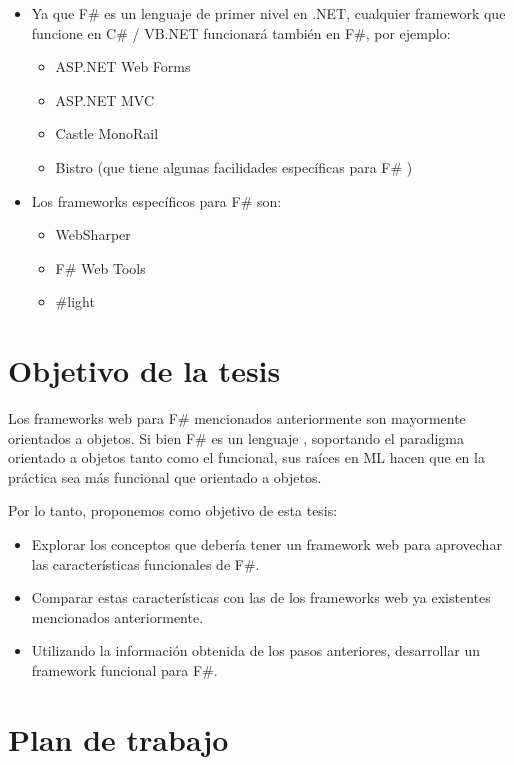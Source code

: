 \documentclass[12pt]{article}
\begin{document}
\begin{itemize}
	\item Ya que F\# es un lenguaje de primer nivel en .NET, cualquier framework que funcione en C\# / VB.NET funcionará también en F\#, por ejemplo:
	\begin{itemize}
		\item ASP.NET Web Forms \cite{webforms}
		\item ASP.NET MVC \cite{mvc}
		\item Castle MonoRail \cite{monorail}
		\item Bistro \cite{bistro} (que tiene algunas facilidades específicas para F\# \cite{bistroext})
	\end{itemize}
	\item Los frameworks específicos para F\# son:
	\begin{itemize}
		\item WebSharper \cite{websharper}
		\item F\# Web Tools \cite{fswebtools}
		\item \#light \cite{sharplight}
	\end{itemize}
\end{itemize}

\section{Objetivo de la tesis}

Los frameworks web para F\# mencionados anteriormente son mayormente orientados a objetos. Si bien F\# es un lenguaje , soportando el paradigma orientado a objetos tanto como el funcional, sus raíces en ML hacen que en la práctica sea más funcional que orientado a objetos.

Por lo tanto, proponemos como objetivo de esta tesis:
\begin{itemize}
	\item Explorar los conceptos que debería tener un framework web para aprovechar las características funcionales de F\#.
	\item Comparar estas características con las de los frameworks web ya existentes mencionados anteriormente.
	\item Utilizando la información obtenida de los pasos anteriores, desarrollar un framework funcional para F\#. 
\end{itemize}

\section{Plan de trabajo}

\printglossaries



\end{document}

